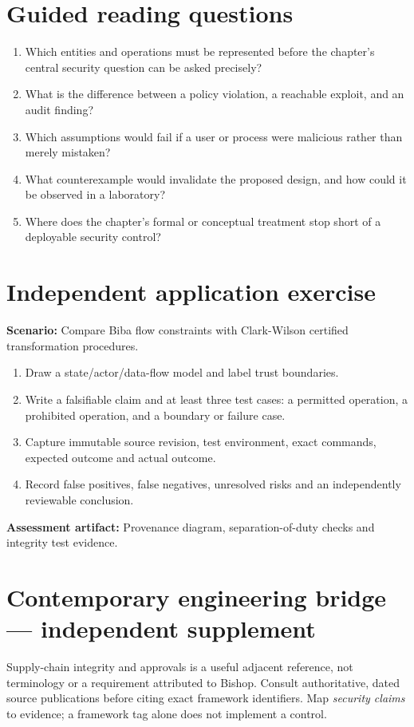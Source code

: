 \documentclass[10pt,letterpaper]{article}
\begin{document}
\section{Guided reading questions}
\begin{enumerate}
\item Which entities and operations must be represented before the chapter's central security question can be asked precisely?
\item What is the difference between a policy violation, a reachable exploit, and an audit finding?
\item Which assumptions would fail if a user or process were malicious rather than merely mistaken?
\item What counterexample would invalidate the proposed design, and how could it be observed in a laboratory?
\item Where does the chapter's formal or conceptual treatment stop short of a deployable security control?
\end{enumerate}
\section{Independent application exercise}
\textbf{Scenario:} Compare Biba flow constraints with Clark-Wilson certified transformation procedures.
\begin{enumerate}
\item Draw a state/actor/data-flow model and label trust boundaries.
\item Write a falsifiable claim and at least three test cases: a permitted operation, a prohibited operation, and a boundary or failure case.
\item Capture immutable source revision, test environment, exact commands, expected outcome and actual outcome.
\item Record false positives, false negatives, unresolved risks and an independently reviewable conclusion.
\end{enumerate}
\textbf{Assessment artifact:} Provenance diagram, separation-of-duty checks and integrity test evidence.
\section{Contemporary engineering bridge --- independent supplement}
Supply-chain integrity and approvals is a useful adjacent reference, not terminology or a requirement attributed to Bishop. Consult authoritative, dated source publications before citing exact framework identifiers. Map \emph{security claims} to evidence; a framework tag alone does not implement a control.
\end{document}
